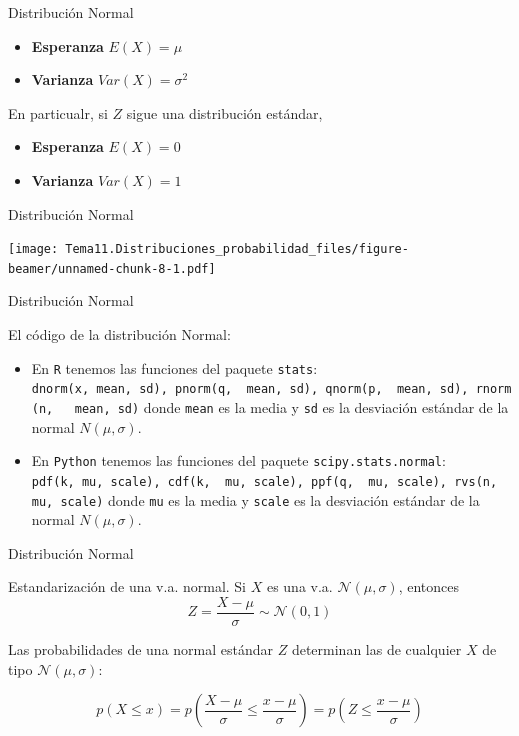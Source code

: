 \documentclass[
  ignorenonframetext,
]{beamer}
\providecommand{\tightlist}{%
  \setlength{\itemsep}{0pt}\setlength{\parskip}{0pt}}
\begin{document}
\begin{frame}{Distribución Normal}
\protect\hypertarget{distribuciuxf3n-normal-1}{}

\begin{itemize}
\tightlist
\item
  \textbf{Esperanza} \(E(X) = \mu\)
\item
  \textbf{Varianza} \(Var(X) = \sigma^2\)
\end{itemize}

En particualr, si \(Z\) sigue una distribución estándar,

\begin{itemize}
\tightlist
\item
  \textbf{Esperanza} \(E(X) = 0\)
\item
  \textbf{Varianza} \(Var(X) = 1\)
\end{itemize}

\end{frame}

\begin{frame}{Distribución Normal}
\protect\hypertarget{distribuciuxf3n-normal-2}{}

\texttt{[image: Tema11.Distribuciones\_probabilidad\_files/figure-beamer/unnamed-chunk-8-1.pdf]}

\end{frame}

\begin{frame}[fragile]{Distribución Normal}
\protect\hypertarget{distribuciuxf3n-normal-3}{}

El código de la distribución Normal:

\begin{itemize}
\tightlist
\item
  En \texttt{R} tenemos las funciones del paquete \texttt{stats}:
  \texttt{dnorm(x,\ mean,\ sd),\ pnorm(q,\ \ mean,\ sd),\ qnorm(p,\ \ mean,\ sd),\ rnorm(n,\ \ \ mean,\ sd)}
  donde \texttt{mean} es la media y \texttt{sd} es la desviación
  estándar de la normal \(N(\mu, \sigma)\).
\item
  En \texttt{Python} tenemos las funciones del paquete
  \texttt{scipy.stats.normal}:
  \texttt{pdf(k,\ mu,\ scale),\ cdf(k,\ \ mu,\ scale),\ ppf(q,\ \ mu,\ scale),\ rvs(n,\ \ mu,\ scale)}
  donde \texttt{mu} es la media y \texttt{scale} es la desviación
  estándar de la normal \(N(\mu, \sigma)\).
\end{itemize}

\end{frame}

\begin{frame}{Distribución Normal}
\protect\hypertarget{distribuciuxf3n-normal-4}{}

Estandarización de una v.a. normal. Si \(X\) es una v.a.
\(\mathcal{N}(\mu,\sigma)\), entonces
\[Z=\frac{X-\mu}{\sigma}\sim\mathcal{N}(0,1)\]

Las probabilidades de una normal estándar \(Z\) determinan las de
cualquier \(X\) de tipo \(\mathcal{N}(\mu,\sigma)\):

\[p(X\le x)=p\left(\frac{X-\mu}{\sigma}\le\frac{x-\mu}{\sigma}\right)=p\left(Z\le\frac{x-\mu}{\sigma}\right)\]

\end{frame}
\end{document}

